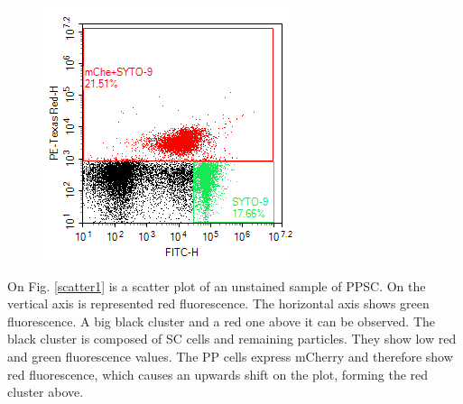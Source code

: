 \documentclass[a4paper, 10pt, conference]{ieeeconf}   %
\begin{document}
\begin{figure}
\begin{minipage}{.48\linewidth}
			\includegraphics[width=1\linewidth]{t8_stained_ppsc1.png}
			\label{scatter2}
			
	\end{minipage}
	
\end{figure}

On Fig. \ref{scatter1} is a scatter plot of an unstained sample of PPSC. On the vertical axis is represented red fluorescence. The horizontal axis shows green fluorescence. A big black cluster and a red one above it can be observed. The black cluster is composed of SC cells and remaining particles. They show  low red and green fluorescence values. The PP cells express mCherry and therefore show red fluorescence, which causes an upwards shift on the plot, forming the red cluster above.
\end{document}
